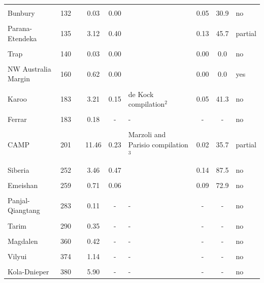 \documentclass[11pt,letterpaper]{article}
\begin{document}
\begin{table}[h!]
{\begin{tabular}{lc>{\raggedright}p{4cm}cc>{\raggedright}p{4cm}ccl}
 & & & & & & & & \\
Bunbury & 132 & \cite{Zhu2009a} & 0.03 & 0.00 & \cite{Thorne2014a} & 0.05 & 30.9 & no \\
 & & & & & & & & \\
Parana-Etendeka & 135 & \cite{Florisbal2014a, Almeida2018a} & 3.12 & 0.40 & \cite{Coffin2006a} & 0.13 & 45.7 & partial \\
 & & & & & & & & \\
Trap & 140 & \cite{Ernst2001a} & 0.03 & 0.00 & \cite{Ernst2001a} & 0.00 & 0.0 & no \\
 & & & & & & & & \\
NW Australia Margin & 160 & \cite{Pirajno2012a} & 0.62 & 0.00 & \cite{Coffin2006a} & 0.00 & 0.0 & yes \\
 & & & & & & & & \\
Karoo & 183 & \cite{Burgess2015a} & 3.21 & 0.15 & de Kock compilation$^{2}$ & 0.05 & 41.3 & no \\
 & & & & & & & & \\
Ferrar & 183 & \cite{Burgess2015a} & 0.18 & - & - & - & - & no \\
 & & & & & & & & \\
CAMP & 201 & \cite{Blackburn2013a} & 11.46 & 0.23 & Marzoli and Parisio compilation$^{3}$ & 0.02 & 35.7 & partial \\
 & & & & & & & & \\
Siberia & 252 & \cite{Burgess2015b} & 3.46 & 0.47 & \cite{Coffin2006a} & 0.14 & 87.5 & no \\
 & & & & & & & & \\
Emeishan & 259 & \cite{Zhou2002a} & 0.71 & 0.06 & \cite{Coffin2006a} & 0.09 & 72.9 & no \\
 & & & & & & & & \\
Panjal-Qiangtang & 283 & \cite{Zhai2013a} & 0.11 & - & - & - & - & no \\
 & & & & & & & & \\
Tarim & 290 & \cite{Xu2014a} & 0.35 & - & - & - & - & no \\
 & & & & & & & & \\
Magdalen & 360 & \cite{Brendan_Murphy1999a} & 0.42 & - & - & - & - & no \\
 & & & & & & & & \\
Vilyui & 374 & \cite{Ricci2013a} & 1.14 & - & - & - & - & no \\
 & & & & & & & & \\
Kola-Dnieper & 380 & \cite{Arzamastsev2014a} & 5.90 & - & - & - & - & no \\

\end{tabular}}
\end{table}
\end{document}
